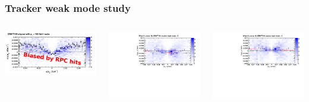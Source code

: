 \documentclass[compress]{beamer}
\begin{document}
\begin{frame}
\frametitle{Tracker weak mode study}

\begin{columns}
\includegraphics[width=\linewidth]{curvature_real.pdf}

\includegraphics[width=\linewidth]{weakmode_times0.pdf}

\includegraphics[width=\linewidth]{weakmode_times1.pdf}


\end{columns}
\end{frame}
\end{document}
